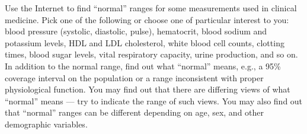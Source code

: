 

Use the Internet to find ``normal'' ranges for some measurements used
in clinical medicine.  Pick one of the following or choose one of
particular interest to you: blood pressure (systolic, diastolic,
pulse), hematocrit, blood sodium and potassium levels, HDL and LDL
cholesterol, white blood cell counts, clotting times, blood sugar
levels, vital respiratory capacity, urine production, and so on.  In addition to the normal range, find out what
``normal'' means, e.g., a 95\% coverage interval on the population or
a range inconsistent with proper physiological function.  You may find
out that there are differing views of what ``normal'' means --- try to
indicate the range of such views.  You may also find out that
``normal'' ranges can be different depending on age, sex, and other
demographic variables.\TextEntry